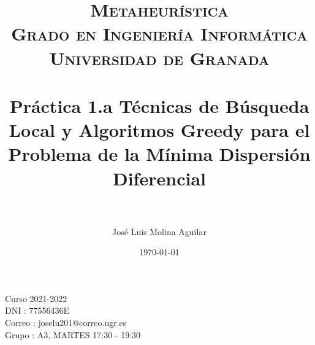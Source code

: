 

\everymath{\displaystyle}

\title{	
\normalfont \normalsize 
\textsc{\textbf{Metaheurística} \\ Grado en Ingeniería Informática \\ Universidad de Granada} \\ [25pt] %
\horrule{0.5pt} \\[0.4cm] %
\huge Práctica 1.a Técnicas de Búsqueda Local y Algoritmos Greedy para el Problema de la Mínima Dispersión Diferencial \\ %
\horrule{2pt} \\[0.5cm] %
}

\author{José Luis Molina Aguilar} %

\date{\normalsize\today} %






\maketitle %
  \begin{large}
    \centering
  \vfill
  
  Curso 2021-2022\\
  DNI : 77556436E\\
  Correo : joselu201@correo.ugr.es\\
  Grupo : A3, MARTES 17:30 - 19:30
  \vfill
  \end{large}
\newpage %

\tableofcontents %

\listoffigures


\newpage




